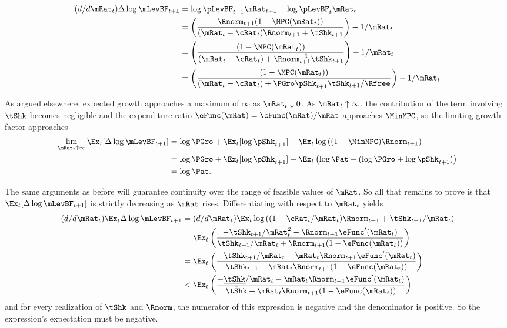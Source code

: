 \documentclass[\econtexRoot/BufferStockTheory]{subfiles}
\begin{document}
\begin{equation}\begin{split}
  (d/d\mRat_{t}) \Delta \log \mLevBF_{t+1} &  = \log \pLevBF_{t+1} \mRat_{t+1} - \log \pLevBF_{t} \mRat_{t} 
  \\   & = \left(\frac{\Rnorm_{t+1}(1-\MPC(\mRat_{t}))}{(\mRat_{t}-\cRat_{t})\Rnorm_{t+1}+\tShk_{t+1}}\right)-1/\mRat_{t}
  \\   & = \left(\frac{(1-\MPC(\mRat_{t}))}{(\mRat_{t}-\cRat_{t})+\Rnorm_{t+1}^{-1}\tShk_{t+1}}\right)-1/\mRat_{t}
\\   & = \left(\frac{(1-\MPC(\mRat_{t}))}{(\mRat_{t}-\cRat_{t})+\PGro\pShk_{t+1}\tShk_{t+1}/\Rfree}\right)-1/\mRat_{t}    
\end{split}\end{equation}


As argued elsewhere, expected growth approaches a maximum of $\infty$ as $\mRat_{t} \downarrow 0$.  As $\mRat_{t} \uparrow \infty$, the contribution of the term involving $\tShk$ becomes negligible and the expenditure ratio $\eFunc(\mRat)=\cFunc(\mRat)/\mRat$ approaches $\MinMPC$, so the limiting growth factor approaches
\begin{equation}\begin{split}
    \lim_{\mRat_{t} \uparrow \infty} \Ex_{t} [\Delta \log \mLevBF_{t+1}] & = \log \PGro + \Ex_{t}[\log \pShk_{t+1}] + \Ex_{t} \log \left((1-\MinMPC)\Rnorm_{t+1}\right)
    \\ & = \log \PGro + \Ex_{t}[\log \pShk_{t+1}] + \Ex_{t}\left( \log \Pat - (\log \PGro + \log \pShk_{t+1})\right)
    \\ & = \log \Pat.
\end{split}\end{equation}

The same arguments as before will guarantee continuity over the range of feasible values of $\mRat$.  So all that remains to prove is that $\Ex_{t} [\Delta \log \mLevBF_{t+1}]$ is strictly decreasing as $\mRat$ rises.
Differentiating with respect to $\mRat_{t}$ yields 
\begin{equation}\begin{split}
    (d/d\mRat_{t})  \Ex_{t} \Delta \log \mLevBF_{t+1} & = (d/d\mRat_{t})\Ex_{t} \log \left((1-\cRat_{t}/\mRat_{t})\Rnorm_{t+1}+\tShk_{t+1}/\mRat_{t}\right)
    \\ & = \Ex_{t} \left(\frac{-\tShk_{t+1}/\mRat^{2}_{t}-\Rnorm_{t+1}\eFunc^{\prime}(\mRat_{t})}{\tShk_{t+1}/\mRat_{t}+\Rnorm_{t+1}(1-\eFunc(\mRat_{t}))}\right)
    \\ & = \Ex_{t} \left(\frac{-\tShk_{t+1}/\mRat_{t}-\mRat_{t}\Rnorm_{t+1}\eFunc^{\prime}(\mRat_{t})}{\tShk_{t+1}+\mRat_{t}\Rnorm_{t+1}(1-\eFunc(\mRat_{t}))}\right)
    \\ & < \Ex_{t} \left(\frac{-\underline{\tShk}/\mRat_{t}-\mRat_{t}\Rnorm_{t+1}\eFunc^{\prime}(\mRat_{t})}{\bar{\tShk}+\mRat_{t}\Rnorm_{t+1}(1-\eFunc(\mRat_{t}))}\right)
  \end{split}\end{equation}
and for every realization of $\tShk$ and $\Rnorm$, the numerator of this expression is negative and the denominator is positive.  So the expression's expectation must be negative.
\end{document}
